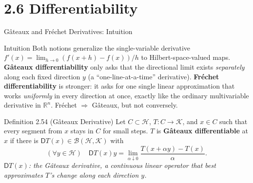 \documentclass[aspectratio=169,10pt]{beamer}
\newcommand{\R}{\mathbb{R}}
\newcommand{\Hil}{\mathcal{H}}
\newcommand{\Kil}{\mathcal{K}}
\begin{document}
\section{2.6 Differentiability}

\begin{frame}{G\^ateaux and Fr\'echet Derivatives: Intuition}
  \begin{block}{Intuition}
    Both notions generalize the single-variable derivative $f'(x) =
    \lim_{h\to0}(f(x+h)-f(x))/h$ to Hilbert-space-valued maps.
    \textbf{G\^ateaux differentiability} only asks that the directional
    limit exists \emph{separately} along each fixed direction $y$ (a
    ``one-line-at-a-time'' derivative). \textbf{Fr\'echet differentiability}
    is stronger: it asks for one single linear approximation that works
    \emph{uniformly} in every direction at once, exactly like the ordinary
    multivariable derivative in $\R^n$. Fr\'echet $\Rightarrow$ G\^ateaux,
    but not conversely.
  \end{block}

  \begin{block}{Definition 2.54 (G\^ateaux Derivative)}
    Let $C\subset\Hil$, $T:C\to\Kil$, and $x\in C$ such that every segment
    from $x$ stays in $C$ for small steps. $T$ is \textbf{G\^ateaux
    differentiable} at $x$ if there is $\mathsf DT(x)\in\mathcal
    B(\Hil,\Kil)$ with
    \[
      (\forall y\in\Hil)\quad \mathsf DT(x)y = \lim_{\alpha\downarrow 0}
      \frac{T(x+\alpha y)-T(x)}{\alpha}.
    \]
    \textit{$\mathsf DT(x)$: the G\^ateaux derivative, a continuous linear
    operator that best approximates $T$'s change along each direction $y$.}
  \end{block}
\end{frame}
\end{document}
